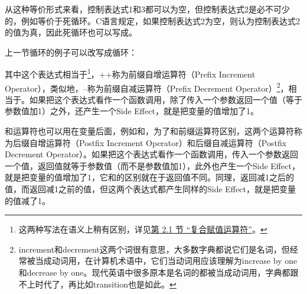 从这种等价形式来看，控制表达式1和3都可以为空，但控制表达式2是必不可少的，例如等价于死循环。C语言规定，如果控制表达式2为空，则认为控制表达式2的值为真，因此死循环也可以写成。



上一节循环的例子可以改写成循环：




其中这个表达式相当于\footnote[9]{这两种写法在语义上稍有区别，详见\hyperlink{db.ch16s02.id2762352}{第 2.\BookSplit{}1 节 “复合赋值运算符”}。}，++称为前缀自增运算符（Prefix Increment Operator），类似地，--称为前缀自减运算符（Prefix Decrement Operator）\footnote[10]{increment和decrement这两个词很有意思，大多数字典都说它们是名词，但经常被当成动词用，在计算机术语中，它们当动词用应该理解为increase by one和decrease by one。现代英语中很多原本是名词的都被当成动词用，字典都跟不上时代了，再比如transition也是如此。}，相当于。如果把这个表达式看作一个函数调用，除了传入一个参数返回一个值（等于参数值加1）之外，还产生一个Side Effect，就是把变量的值增加了1。



\BookCode{+\BookSplit{}+\BookSplit{}}和\BookCode{-\BookSplit{}-\BookSplit{}}运算符也可以用在变量后面，例如和，为了和前缀运算符区别，这两个运算符称为后缀自增运算符（Postfix Increment Operator）和后缀自减运算符（Postfix Decrement Operator）。如果把这个表达式看作一个函数调用，传入一个参数返回一个值，返回值就等于参数值（而不是参数值加1），此外也产生一个Side Effect，就是把变量的值增加了1，它和的区别就在于返回值不同。同理，返回减1之后的值，而返回减1之前的值，但这两个表达式都产生同样的Side Effect，就是把变量的值减了1。



